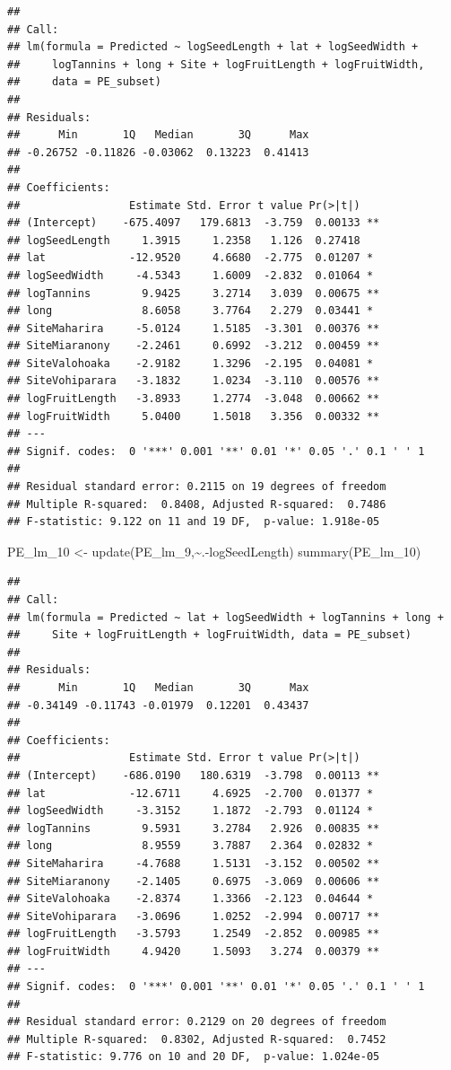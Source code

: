 \documentclass[
  12pt,
]{article}
\newenvironment{Shaded}{\begin{snugshade}}{\end{snugshade}}
\newcommand{\FunctionTok}[1]{\textcolor[rgb]{0.00,0.00,0.00}{#1}}
\newcommand{\NormalTok}[1]{#1}
\newcommand{\OtherTok}[1]{\textcolor[rgb]{0.56,0.35,0.01}{#1}}
\newcommand{\SpecialCharTok}[1]{\textcolor[rgb]{0.00,0.00,0.00}{#1}}
\begin{document}
\begin{verbatim}
## 
## Call:
## lm(formula = Predicted ~ logSeedLength + lat + logSeedWidth + 
##     logTannins + long + Site + logFruitLength + logFruitWidth, 
##     data = PE_subset)
## 
## Residuals:
##      Min       1Q   Median       3Q      Max 
## -0.26752 -0.11826 -0.03062  0.13223  0.41413 
## 
## Coefficients:
##                 Estimate Std. Error t value Pr(>|t|)   
## (Intercept)    -675.4097   179.6813  -3.759  0.00133 **
## logSeedLength     1.3915     1.2358   1.126  0.27418   
## lat             -12.9520     4.6680  -2.775  0.01207 * 
## logSeedWidth     -4.5343     1.6009  -2.832  0.01064 * 
## logTannins        9.9425     3.2714   3.039  0.00675 **
## long              8.6058     3.7764   2.279  0.03441 * 
## SiteMaharira     -5.0124     1.5185  -3.301  0.00376 **
## SiteMiaranony    -2.2461     0.6992  -3.212  0.00459 **
## SiteValohoaka    -2.9182     1.3296  -2.195  0.04081 * 
## SiteVohiparara   -3.1832     1.0234  -3.110  0.00576 **
## logFruitLength   -3.8933     1.2774  -3.048  0.00662 **
## logFruitWidth     5.0400     1.5018   3.356  0.00332 **
## ---
## Signif. codes:  0 '***' 0.001 '**' 0.01 '*' 0.05 '.' 0.1 ' ' 1
## 
## Residual standard error: 0.2115 on 19 degrees of freedom
## Multiple R-squared:  0.8408, Adjusted R-squared:  0.7486 
## F-statistic: 9.122 on 11 and 19 DF,  p-value: 1.918e-05
\end{verbatim}

\begin{Shaded}
\begin{Highlighting}[]
\NormalTok{PE\_lm\_10 }\OtherTok{\textless{}{-}} \FunctionTok{update}\NormalTok{(PE\_lm\_9,}\SpecialCharTok{\textasciitilde{}}\NormalTok{.}\SpecialCharTok{{-}}\NormalTok{logSeedLength)}
\FunctionTok{summary}\NormalTok{(PE\_lm\_10)}
\end{Highlighting}
\end{Shaded}

\begin{verbatim}
## 
## Call:
## lm(formula = Predicted ~ lat + logSeedWidth + logTannins + long + 
##     Site + logFruitLength + logFruitWidth, data = PE_subset)
## 
## Residuals:
##      Min       1Q   Median       3Q      Max 
## -0.34149 -0.11743 -0.01979  0.12201  0.43437 
## 
## Coefficients:
##                 Estimate Std. Error t value Pr(>|t|)   
## (Intercept)    -686.0190   180.6319  -3.798  0.00113 **
## lat             -12.6711     4.6925  -2.700  0.01377 * 
## logSeedWidth     -3.3152     1.1872  -2.793  0.01124 * 
## logTannins        9.5931     3.2784   2.926  0.00835 **
## long              8.9559     3.7887   2.364  0.02832 * 
## SiteMaharira     -4.7688     1.5131  -3.152  0.00502 **
## SiteMiaranony    -2.1405     0.6975  -3.069  0.00606 **
## SiteValohoaka    -2.8374     1.3366  -2.123  0.04644 * 
## SiteVohiparara   -3.0696     1.0252  -2.994  0.00717 **
## logFruitLength   -3.5793     1.2549  -2.852  0.00985 **
## logFruitWidth     4.9420     1.5093   3.274  0.00379 **
## ---
## Signif. codes:  0 '***' 0.001 '**' 0.01 '*' 0.05 '.' 0.1 ' ' 1
## 
## Residual standard error: 0.2129 on 20 degrees of freedom
## Multiple R-squared:  0.8302, Adjusted R-squared:  0.7452 
## F-statistic: 9.776 on 10 and 20 DF,  p-value: 1.024e-05
\end{verbatim}
\end{document}
